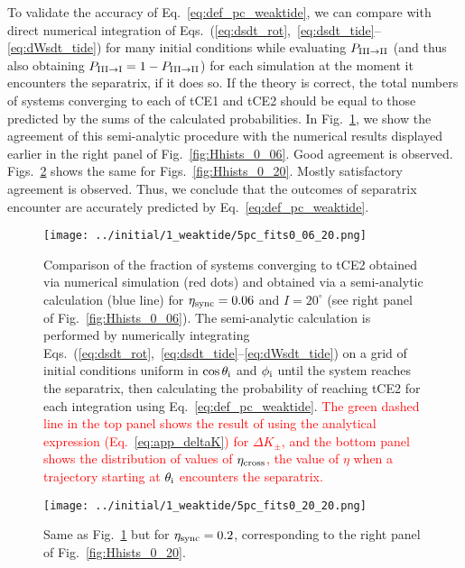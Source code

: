 \documentclass[
        fleqn,
        usenatbib,
    ]{mnras}
\begin{document}
To validate the accuracy of Eq.~\eqref{eq:def_pc_weaktide}, we can compare with
direct numerical integration of
Eqs.~(\ref{eq:dsdt_rot},~\ref{eq:dsdt_tide}--\ref{eq:dWsdt_tide}) for many
initial conditions while evaluating $P_{\rm III \to II}$ (and thus also
obtaining $P_{\rm III \to I} = 1 - P_{\rm III \to II}$) for each simulation at
the moment it encounters the separatrix, if it does so. If the theory is
correct, the total numbers of systems converging to each of tCE1 and tCE2 should
be equal to those predicted by the sums of the calculated probabilities. In
Fig.~\ref{fig:pc_fits_0_06}, we show the agreement of this semi-analytic
procedure with the numerical results displayed earlier in the right panel of
Fig.~\ref{fig:Hhists_0_06}. Good agreement is observed.
Figs.~\ref{fig:pc_fits_0_20} shows the same for Figs.~\ref{fig:Hhists_0_20}.
Mostly satisfactory agreement is observed. Thus, we conclude that the outcomes
of separatrix encounter are accurately predicted by
Eq.~\eqref{eq:def_pc_weaktide}.
\begin{figure}
    \centering
    \texttt{[image: ../initial/1\_weaktide/5pc\_fits0\_06\_20.png]}
    \caption{Comparison of the fraction of systems converging to tCE2 obtained
    via numerical simulation (red dots) and obtained via a semi-analytic
    calculation (blue line) for $\eta_{\rm sync} = 0.06$ and $I = 20^\circ$ (see
    right panel of Fig.~\ref{fig:Hhists_0_06}). The semi-analytic calculation is
    performed by numerically integrating
    Eqs.~(\ref{eq:dsdt_rot},~\ref{eq:dsdt_tide}--\ref{eq:dWsdt_tide}) on a grid
    of initial conditions uniform in $\cos \theta_{\rm i}$ and $\phi_{\rm i}$
    until the system reaches the separatrix, then calculating the probability of
    reaching tCE2 for each integration using
    Eq.~\eqref{eq:def_pc_weaktide}.
    \textcolor{red}{The green dashed line in the top panel shows the result of
    using the analytical expression (Eq.~\ref{eq:app_deltaK}) for $\Delta
    K_{\pm}$, and the bottom panel shows the distribution of values of
    $\eta_{\rm cross}$, the value of $\eta$ when a trajectory starting at
    $\theta_{\rm i}$ encounters the separatrix. }}\label{fig:pc_fits_0_06}
\end{figure}
\begin{figure}
    \centering
    \texttt{[image: ../initial/1\_weaktide/5pc\_fits0\_20\_20.png]}
    \caption{Same as Fig.~\ref{fig:pc_fits_0_06} but for $\eta_{\rm sync} =
    0.2$, corresponding to the right panel of
    Fig.~\ref{fig:Hhists_0_20}.}\label{fig:pc_fits_0_20}
\end{figure}
\end{document}
